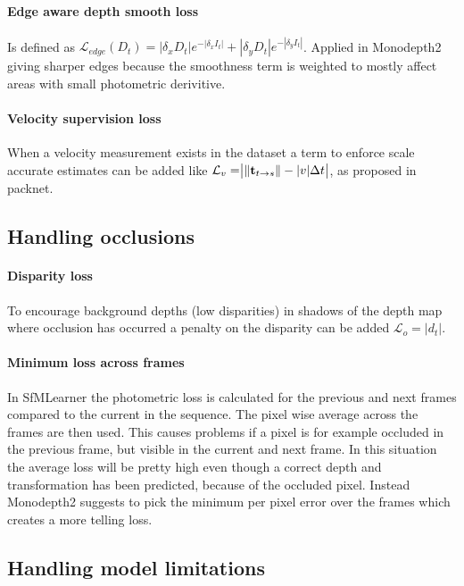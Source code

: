 \paragraph{Edge aware depth smooth loss} Is defined as $ \mathcal{L}_{edge}(D_t)=|\delta_x D_t|e^{-|\delta_x I_t|} + |\delta_y D_t|e^{-|\delta_y I_t|} $. Applied in Monodepth2 giving sharper edges because the smoothness term is weighted to mostly affect areas with small photometric derivitive.

\paragraph{Velocity supervision loss} When a velocity measurement exists in the dataset a term to enforce scale accurate estimates can be added like $ \mathcal{L}_{v} = \bigr{|} \| \textbf{t}_{t \rightarrow s} \| - |v|\Delta t \bigr{|} $, as proposed in packnet\cite{packnet}.

\subsection{Handling occlusions}
\label{sec:occlusion}

\paragraph{Disparity loss} To encourage background depths (low disparities) in shadows of the depth map where occlusion has occurred a penalty on the disparity can be added $ \mathcal{L}_{o} =|d_t|. $

\paragraph{Minimum loss across frames} In SfMLearner the photometric loss is calculated for the previous and next frames compared to the current in the sequence. The pixel wise average across the frames are then used. This causes problems if a pixel is for example occluded in the previous frame, but visible in the current and next frame. In this situation the average loss will be pretty high even though a correct depth and transformation has been predicted, because of the occluded pixel. Instead Monodepth2 suggests to pick the minimum per pixel error over the frames which creates a more telling loss. 

\subsection{Handling model limitations}
\label{sec:modellimit}

